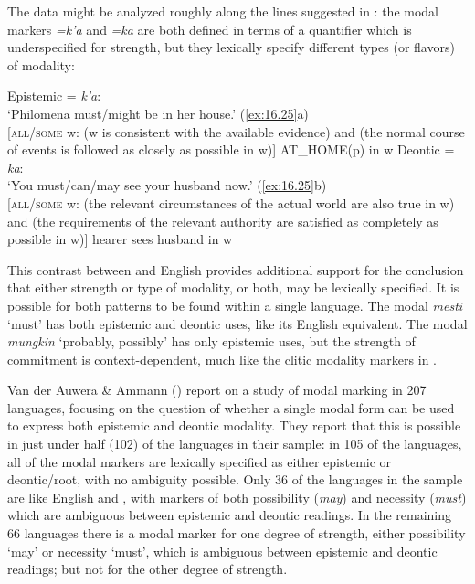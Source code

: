 The  data might be analyzed roughly along the lines suggested in : the modal markers \textit{=k’a} and \textit{=ka} are both defined in terms of a quantifier which is underspecified for strength, but they lexically specify different types (or flavors) of modality:


\ea \label{ex:16.26}
\ea Epistemic = \textit{k’a}:\\
‘Philomena must/might be in her house.’ (\ref{ex:16.25}a)\\
{}[\textsc{all/some} w: (w is consistent with the available evidence) and (the normal course of events is followed as closely as possible in w)] AT\_HOME(p) in w
\ex Deontic = \textit{ka}:\\
‘You must/can/may see your husband now.’ (\ref{ex:16.25}b)\\
{}[\textsc{all/some} w: (the relevant circumstances of the actual world are also true in w) and (the requirements of the relevant authority are satisfied as completely as possible in w)] hearer sees husband in w
\z \z


This contrast between  and English provides additional support for the conclusion that either strength or type of modality, or both, may be lexically specified. It is possible for both patterns to be found within a single language. The  modal \textit{mesti} ‘must’ has both epistemic and deontic uses, like its English equivalent. The  modal \textit{mungkin} ‘probably, possibly’ has only epistemic uses, but the strength of commitment is context-dependent, much like the clitic modality markers in .

Van der Auwera \& Ammann (\citeyear{vanderAuweraAmmann2013}) report on a study of modal marking in 207 languages, focusing on the question of whether a single modal form can be used to express both epistemic and deontic modality. They report that this is possible in just under half (102) of the languages in their sample: in 105 of the languages, all of the modal markers are lexically specified as either epistemic or deontic/root, with no ambiguity possible. Only 36 of the languages in the sample are like English and , with markers of both possibility (\textit{may}) and necessity (\textit{must}) which are ambiguous between epistemic and deontic readings. In the remaining 66 languages there is a modal marker for one degree of strength, either possibility ‘may’ or necessity ‘must’, which is ambiguous between epistemic and deontic readings; but not for the other degree of strength.


